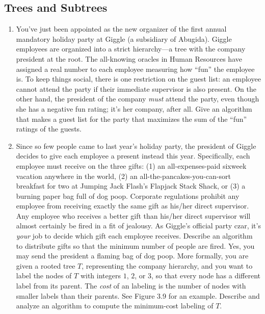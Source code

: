 \subsection*{Trees and Subtrees}
\begin{enumerate}[label=\arabic*.,ref=\thechapter.\arabic*,leftmargin=*,align=left,widest*=99,itemsep=1.5ex plus 0.5ex,resume]
\item You’ve just been appointed as the new organizer of the first annual mandatory holiday party at Giggle (a subsidiary of Abugida).
Giggle employees are organized into a strict hierarchy—a tree with the company president at the root.
The all-knowing oracles in Human Resources have assigned a real number to each employee measuring how “fun” the employee is.
To keep things social, there is one restriction on the guest list: an employee cannot attend the party if their immediate supervisor is also present.
On the other hand, the president of the company \textit{must} attend the party, even though she has a negative fun rating; it’s her company, after all.
Give an algorithm that makes a guest list for the party that maximizes the sum of the “fun” ratings of the guests.
\item Since so few people came to last year’s holiday party, the president of Giggle decides to give each employee a present instead this year.
Specifically, each employee must receive on the three gifts: (1) an all-expenses-paid sixweek vacation anywhere in the world, (2) an all-the-pancakes-you-can-sort breakfast for two at Jumping Jack Flash’s Flapjack Stack Shack, or (3) a burning paper bag full of dog poop.
Corporate regulations prohibit any employee from receiving exactly the same gift as his/her direct supervisor.
Any employee who receives a better gift than his/her direct supervisor will almost certainly be fired in a fit of jealousy.
As Giggle’s official party czar, it’s \textit{your} job to decide which gift each employee receives.
Describe an algorithm to distribute gifts so that the minimum number of people are fired.
Yes, you may send the president a flaming bag of dog poop.
More formally, you are given a rooted tree $T$, representing the company hierarchy, and you want to label the nodes of $T$ with integers $1$, $2$, or $3$, so that every node has a different label from its parent.
The \textit{cost} of an labeling is the number of nodes with smaller labels than their parents.
See Figure 3.9 for an example.
Describe and analyze an algorithm to compute the minimum-cost labeling of $T$.
\begin{figure}[ht]
\centering

\end{figure}
\end{enumerate}
